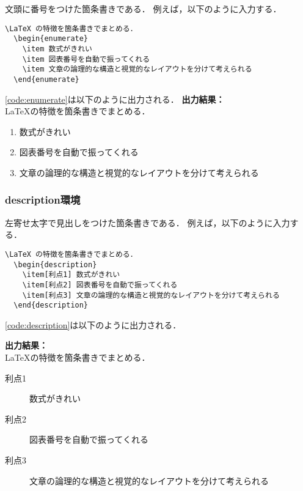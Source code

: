 文頭に番号をつけた箇条書きである．
例えば，以下のように入力する．
\begin{lstlisting}[caption=enumerate環境,label=code:enumerate]
  \LaTeX の特徴を箇条書きでまとめる．
  \begin{enumerate}
    \item 数式がきれい
    \item 図表番号を自動で振ってくれる
    \item 文章の論理的な構造と視覚的なレイアウトを分けて考えられる
  \end{enumerate}
\end{lstlisting}
\code\ref{code:enumerate}は以下のように出力される．
\clearpage
\noindent\textbf{出力結果：}\hrulefill\\
  \LaTeX の特徴を箇条書きでまとめる．
  \begin{enumerate}
    \item 数式がきれい
    \item 図表番号を自動で振ってくれる
    \item 文章の論理的な構造と視覚的なレイアウトを分けて考えられる
  \end{enumerate} 
\noindent\hrulefill 

\subsubsection{description環境}

左寄せ太字で見出しをつけた箇条書きである．
例えば，以下のように入力する．
\begin{lstlisting}[caption=description環境,label=code:description]
  \LaTeX の特徴を箇条書きでまとめる．
  \begin{description}
    \item[利点1] 数式がきれい
    \item[利点2] 図表番号を自動で振ってくれる
    \item[利点3] 文章の論理的な構造と視覚的なレイアウトを分けて考えられる
  \end{description}
\end{lstlisting}
\code\ref{code:description}は以下のように出力される．

\noindent\textbf{出力結果：}\hrulefill\\
  \LaTeX の特徴を箇条書きでまとめる．
  \begin{description}
    \item[利点1] 数式がきれい
    \item[利点2] 図表番号を自動で振ってくれる
    \item[利点3] 文章の論理的な構造と視覚的なレイアウトを分けて考えられる
  \end{description} 
\noindent\hrulefill 
